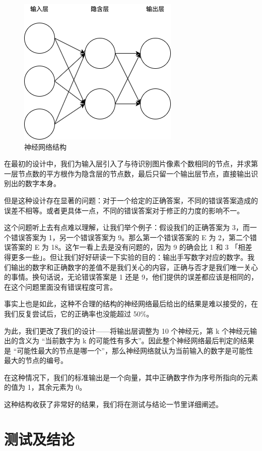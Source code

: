 \begin{figure}
    \centering
    \includegraphics{BP.png}
    \caption{神经网络结构}
    \label{fig:BP}
\end{figure}

在最初的设计中，我们为输入层引入了与待识别图片像素个数相同的节点，并求第一层节点数的平方根作为隐含层的节点数，最后只留一个输出层节点，直接输出识别出的数字本身。

但是这种设计存在显著的问题：对于一个给定的正确答案，不同的错误答案造成的误差不相等。或者更具体一点，不同的错误答案对于修正的力度的影响不一。

这个问题听上去有点难以理解，让我们举个例子：假设我们的正确答案为 3，而一个错误答案为 1，另一个错误答案为 9。那么第一个错误答案的 E 为 2，第二个错误答案的 E 为 18。这乍一看上去是没有问题的，因为 9 的确会比 1 和 3 「相差得更多一些」。但让我们好好研读一下实验的目的：输出手写数字对应的数字。我们输出的数字和正确数字的差值不是我们关心的内容，正确与否才是我们唯一关心的事情。换句话说，无论错误答案是 1 还是 9，他们提供的误差都应该是相同的，在这个问题里面没有错误程度可言。

事实上也是如此，这种不合理的结构的神经网络最后给出的结果是难以接受的，在我们反复尝试后，它的正确率也没能超过 50\%。

为此，我们更改了我们的设计——将输出层调整为 10 个神经元\cite{op}，第 k 个神经元输出的含义为 “当前数字为 k 的可能性有多大”。因此整个神经网络最后判定的结果是 “可能性最大的节点是哪一个”，那么神经网络就认为当前输入的数字是可能性最大的节点的编号。

在这种情况下，我们的标准输出是一个向量，其中正确数字作为序号所指向的元素的值为 1，其余元素为 0。

这种结构收获了非常好的结果，我们将在测试与结论一节里详细阐述。

\section{测试及结论}

